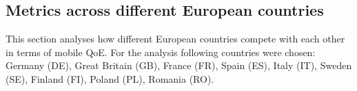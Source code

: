 
\subsection{Metrics across different European countries}

This section analyses how different European countries compete with each other in terms of mobile QoE. For the analysis following countries were chosen: Germany (DE), Great Britain (GB), France (FR), Spain (ES), Italy (IT), Sweden (SE), Finland (FI), Poland (PL), Romania (RO). 


